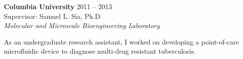 \documentclass[10pt]{article}
\newenvironment{innerlist}[1][\enskip\textbullet]%
        {\begin{itemize}[#1,leftmargin=*,parsep=0pt,itemsep=0pt,topsep=0pt,partopsep=0pt]}
        {\end{itemize}}
\begin{document}

\textbf{Columbia University} \hfill {2011 -- 2013} \\
Supervisor: Samuel L. Sia, Ph.D. \\
\textit{Molecular and Microscale Bioengineering Laboratory}
	\vspace{0.08in}

As an undergraduate research assistant, I worked on developing a point-of-care microfluidic device to diagnose multi-drug resistant tuberculosis. 



%

\end{document}
